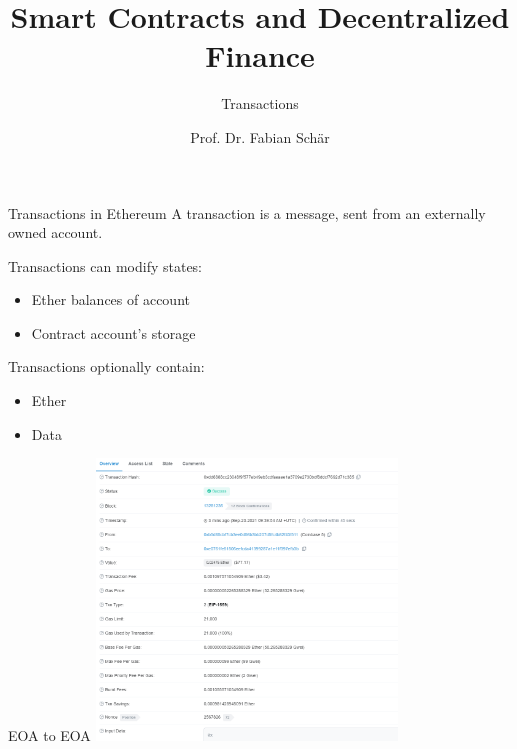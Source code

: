 \documentclass[handout]{beamer}
\title{Smart Contracts and Decentralized Finance}
\subtitle{Transactions}
\author{Prof. Dr. Fabian Schär}
\institute{University of Basel}
\begin{document}
\thispagestyle{empty}
\begin{frame}[noframenumbering]
	\titlepage
\end{frame}

\begin{frame}{Transactions in Ethereum}
A transaction is a message, sent from an externally owned account.
\vspace{1em}

Transactions can modify states:
	\begin{itemize}
		\item<1-> Ether balances of account
		\item<2-> Contract account's storage
	\end{itemize}
\vspace{1em}

Transactions optionally contain:
	\begin{itemize}
		\item<1-> Ether
		\item<2-> Data
	\end{itemize}
\vspace{1em}



\end{frame}

\begin{frame}{EOA to EOA}
\center
\includegraphics[width=8cm]{../assets/images/EOA_to_EOA}

\end{frame}
\end{document}
